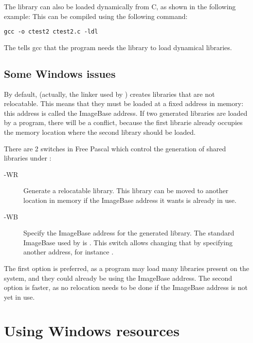 The library can also be loaded dynamically from C, as shown in the following
example:
This can be compiled using the following command:
\begin{verbatim}
gcc -o ctest2 ctest2.c -ldl
\end{verbatim}

The  tells gcc that the program needs the  library
to load dynamical libraries.

\section{Some Windows issues}
\label{shlibwinissues}
By default, \fpc (actually, the linker used by \fpc)
creates libraries that are not relocatable. This means that they must be
loaded at a fixed address in memory: this address is called the
ImageBase address. If two \fpc generated libraries are loaded by a
program, there will be a conflict, because the first librarie already
occupies the memory location where the second library should be loaded.

There are 2 switches in Free Pascal which control the generation of
shared libraries under \windows:
\begin{description}
\item[-WR] Generate a relocatable library. This library can be moved to
another location in memory if the ImageBase address it wants is already
in use.
\item[-WB] Specify the ImageBase address for the generated library.
The standard ImageBase used by \fpc is . This switch
allows changing that by specifying another address, for instance
.
\end{description}
The first option is preferred, as a program may load many libraries
present on the system, and they could already be using the ImageBase
address. The second option is faster, as no relocation needs to be
done if the ImageBase address is not yet in use.


\chapter{Using Windows resources}
\label{ch:windres}

